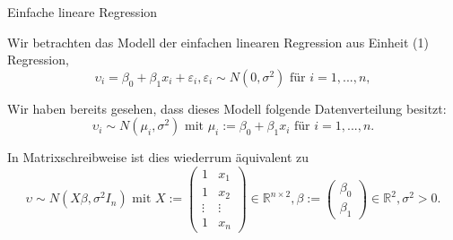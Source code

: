 \documentclass[
  8pt,
  ignorenonframetext,
]{beamer}
\begin{document}
\begin{frame}{Einfache lineare Regression}
\protect\hypertarget{einfache-lineare-regression}{}
\small

Wir betrachten das Modell der einfachen linearen Regression aus Einheit
(1) Regression, \begin{equation}\label{eq:slr}
\upsilon_i = \beta_0 + \beta_1x_i + \varepsilon_i, \varepsilon_i \sim N(0,\sigma^2) \mbox{ für } i = 1,...,n,
\end{equation}

Wir haben bereits gesehen, dass dieses Modell folgende Datenverteilung
besitzt: \begin{equation}
\upsilon_i \sim N(\mu_i,\sigma^2) \mbox{ mit } \mu_i := \beta_0 + \beta_1x_i \mbox{ für } i = 1,...,n.
\end{equation}

In Matrixschreibweise ist dies wiederrum äquivalent zu \begin{equation}
\upsilon \sim N(X\beta,\sigma^2I_n) \mbox{ mit }
X :=
\begin{pmatrix}
1      & x_1        \\
1      & x_2        \\
\vdots & \vdots     \\
1      & x_n
\end{pmatrix}
\in \mathbb{R}^{n \times 2},
\beta :=
\begin{pmatrix}
\beta_0 \\
\beta_1
\end{pmatrix}
\in \mathbb{R}^2,
\sigma^2 > 0.
\end{equation}
\end{frame}
\end{document}
